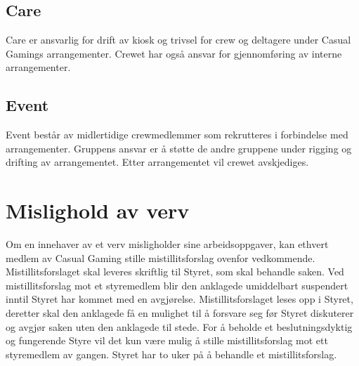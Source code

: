 \subsection{Care}
Care er ansvarlig for drift av kiosk og trivsel for crew og deltagere under Casual Gamings arrangementer. Crewet har også ansvar for gjennomføring av interne arrangementer.

\subsection{Event}
Event består av midlertidige crewmedlemmer som rekrutteres i forbindelse med arrangementer. Gruppens ansvar er å støtte de andre gruppene under rigging og drifting av arrangementet. Etter arrangementet vil crewet avskjediges.

\section{Mislighold av verv}
Om en innehaver av et verv misligholder sine arbeidsoppgaver, kan ethvert medlem av Casual Gaming stille mistillitsforslag ovenfor vedkommende. Mistillitsforslaget skal leveres skriftlig til Styret, som skal behandle saken. Ved mistillitsforslag mot et styremedlem blir den anklagede umiddelbart suspendert inntil Styret har kommet med en avgjørelse. Mistillitsforslaget leses opp i Styret, deretter skal den anklagede få en mulighet til å forsvare seg før Styret diskuterer og avgjør saken uten den anklagede til stede. For å beholde et beslutningsdyktig og fungerende Styre vil det kun være mulig å stille mistillitsforslag mot ett styremedlem av gangen. Styret har to uker på å behandle et mistillitsforslag.
